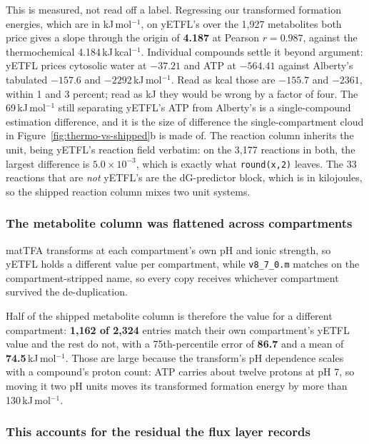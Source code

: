 This is measured, not read off a label. Regressing our transformed formation energies, which
are in kJ\,mol$^{-1}$, on yETFL's over the 1{,}927 metabolites both price gives a slope
through the origin of \textbf{4.187} at Pearson $r = 0.987$, against the thermochemical
4.184\,kJ\,kcal$^{-1}$. Individual compounds settle it beyond argument: yETFL prices
cytosolic water at $-37.21$ and ATP at $-564.41$ against Alberty's tabulated $-157.6$ and
$-2292$\,kJ\,mol$^{-1}$. Read as kcal those are $-155.7$ and $-2361$, within 1 and 3
percent; read as kJ they would be wrong by a factor of four. The 69\,kJ\,mol$^{-1}$ still
separating yETFL's ATP from Alberty's is a single-compound estimation difference, and it is
the size of difference the single-compartment cloud in
Figure~\ref{fig:thermo-vs-shipped}b is made of. The reaction column inherits the unit,
being yETFL's reaction field verbatim: on the 3{,}177 reactions in both, the largest
difference is $5.0\times10^{-3}$, which is exactly what \texttt{round(x,2)} leaves. The 33
reactions that are \emph{not} yETFL's are the dG-predictor block, which is in kilojoules, so
the shipped reaction column mixes two unit systems.

\subsubsection*{The metabolite column was flattened across compartments}

matTFA transforms at each compartment's own pH and ionic strength, so yETFL holds a
different value per compartment, while \texttt{v8\_7\_0.m} matches on the
compartment-stripped name, so every copy receives whichever compartment survived the
de-duplication.

Half of the shipped metabolite column is therefore the value for a different compartment:
\textbf{1{,}162 of 2{,}324} entries match their own compartment's yETFL value and the rest do
not, with a 75th-percentile error of \textbf{86.7} and a mean of \textbf{74.5}\,kJ\,mol$^{-1}$.
Those are large because the transform's pH dependence scales with a compound's proton count:
ATP carries about twelve protons at pH 7, so moving it two pH units moves its transformed
formation energy by more than 130\,kJ\,mol$^{-1}$.

\subsubsection*{This accounts for the residual the flux layer records}

